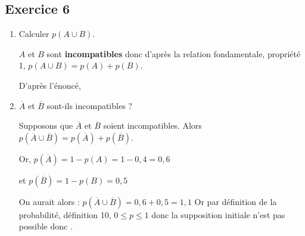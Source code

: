 \documentclass[openany]{book}
\begin{document}
\subsection{Exercice 6}

 \begin{minipage}{0.5\linewidth}


\begin{enumerate}
\item Calculer $p(A \cup B)$.

$A$ et $B$ sont \textbf{incompatibles} donc d'après la relation fondamentale, propriété 1, $p(A \cup B)=p(A)+p(B)$.

D'après l'énoncé, 

\item $\overline{A}$ et $\overline{B}$ sont-ils incompatibles ?

Supposons que $\overline{A}$ et $\overline{B}$ soient incompatibles. Alors $p(\overline{A} \cup \overline{B})=p(\overline{A})+p(\overline{B})$.

Or, $p(\overline{A})= 1-p(A)=1-0,4=0,6$ 

et $p(\overline{B})= 1-p(B)=0,5$ 

On aurait alors : $p(\overline{A} \cup \overline{B})=0,6+0,5 = 1,1$ Or par définition de la probabilité, définition 10, $0\leq p \leq 1$ donc la supposition initiale n'est pas possible donc .

\end{enumerate}

\end{minipage}

\newpage
\end{document}
